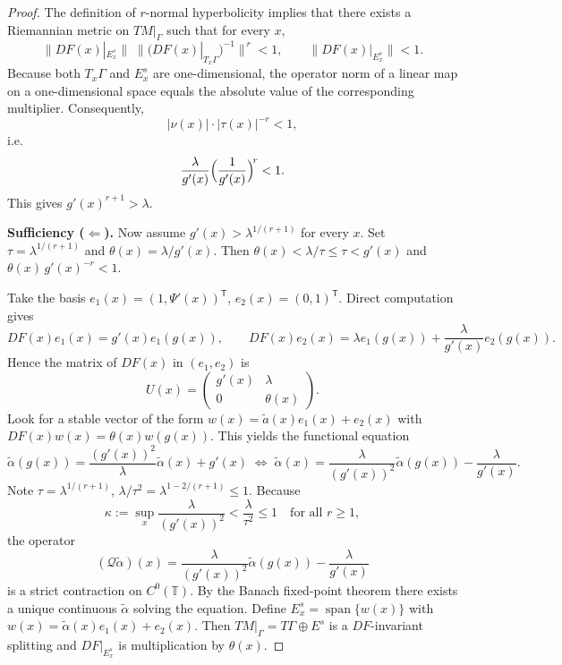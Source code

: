 \documentclass{amsart}
\begin{document}
\begin{proof}
\medskip

The definition of $r$-normal hyperbolicity  implies that there exists a
Riemannian metric on $TM|_\Gamma$ such that for every $x$,
\[
\|DF(x)|_{E^s_x}\| \; \bigl\|(DF(x)|_{T_x\Gamma})^{-1}\bigr\|^{\,r} < 1,
\qquad
\|DF(x)|_{E^s_x}\| < 1.
\]
Because both $T_x\Gamma$ and $E^s_x$ are one-dimensional, the operator norm of a linear
map on a one-dimensional space equals the absolute value of the corresponding multiplier.
Consequently,
\[
|\nu(x)| \cdot |\tau(x)|^{-r} < 1,
\]
i.e.\
\[
\frac{\lambda}{g'(x)} \Bigl(\frac{1}{g'(x)}\Bigr)^{\!r} < 1.
\]
This gives $g'(x)^{r+1} > \lambda$.

		
		\medskip
		\noindent\textbf{Sufficiency ($\Leftarrow$).}
		Now assume $g'(x)>\lambda^{1/(r+1)}$ for every $x$.
		Set $\tau=\lambda^{1/(r+1)}$ and $\theta(x)=\lambda/g'(x)$. Then
		$\theta(x)<\lambda/\tau\le \tau< g'(x)$ and $\theta(x)\,g'(x)^{-r}<1$.
		
		\medskip
	
		Take the basis $e_1(x)=(1,\Psi'(x))^{\mathsf{T}}$, $e_2(x)=(0,1)^{\mathsf{T}}$.
		Direct computation gives
		\[
		DF(x)e_1(x)=g'(x)e_1(g(x)),\qquad
		DF(x)e_2(x)=\lambda e_1(g(x))+\frac{\lambda}{g'(x)}e_2(g(x)).
		\]
		Hence the matrix of $DF(x)$ in $(e_1,e_2)$ is
		\[U(x)=\begin{pmatrix} g'(x) & \lambda \\ 0 & \theta(x) \end{pmatrix}.\]
		Look for a stable vector of the form $w(x)=\tilde a(x)e_1(x)+e_2(x)$ with
		$DF(x)w(x)=\theta(x)w(g(x))$. This yields the functional equation
		\[
		\tilde \alpha(g(x))=\frac{(g'(x))^2}{\lambda}\tilde \alpha(x)+g'(x)
		\;\Longleftrightarrow\;
		\tilde \alpha(x)=\frac{\lambda}{(g'(x))^2}\tilde \alpha(g(x))-\frac{\lambda}{g'(x)}.
		\]
		Note $\tau=\lambda^{1/(r+1)}$, $\lambda/\tau^2=\lambda^{1-2/(r+1)}\le1$. Because \[\displaystyle\kappa:=\sup_x\frac{\lambda}{(g'(x))^2}
		<\frac{\lambda}{\tau^2}\le1 \quad \text{for all } r\ge 1, \]
		the operator
		\[(\mathcal{Q}\tilde{\alpha})(x)=\frac{\lambda}{(g'(x))^2}\tilde{\alpha}(g(x))-\frac{\lambda}{g'(x)}\]
		is a strict contraction on $C^0(\mathbb{T})$.
		By the Banach fixed-point theorem there exists a unique continuous $\tilde \alpha$
		solving the equation.
		Define $E^s_x=\operatorname{span}\{w(x)\}$ with $w(x)=\tilde \alpha(x)e_1(x)+e_2(x)$.
		Then $TM|_\Gamma=T\Gamma\oplus E^s$ is a $DF$-invariant splitting and
		$DF|_{E^s_x}$ is multiplication by $\theta(x)$.
		
		\medskip


\end{proof}
\end{document}
